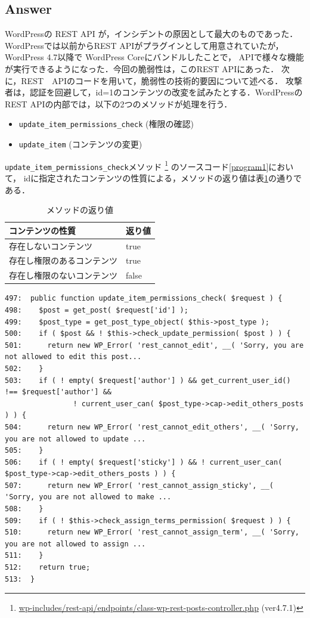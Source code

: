 \documentclass[uplatex]{jsarticle}
\begin{document}
\subsection*{Answer}

WordPressの REST API が，インシデントの原因として最大のものであった．
WordPressでは以前からREST APIがプラグインとして用意されていたが，
WordPress 4.7以降で WordPress Coreにバンドルしたことで，
APIで様々な機能が実行できるようになった．今回の脆弱性は，このREST APIにあった．
次に，REST　APIのコードを用いて，脆弱性の技術的要因について述べる．
攻撃者は，認証を回避して，id=1のコンテンツの改変を試みたとする．WordPressのREST APIの内部では，以下の2つのメソッドが処理を行う．

\begin{itemize}
    \item \verb|update_item_permissions_check| (権限の確認)
    \item \verb|update_item| (コンテンツの変更)
\end{itemize}

\verb|update_item_permissions_check|メソッド
\footnote{\url{wp-includes/rest-api/endpoints/class-wp-rest-posts-controller.php} (ver4.7.1)}
のソースコード\ref{program1}において，
idに指定されたコンテンツの性質による，メソッドの返り値は表\ref{tab:return_value}の通りである．

\begin{table}[htbp]
    \centering
    \caption{メソッドの返り値}
    \label{tab:return_value}
    \begin{tabular}{|l|l|}
    \hline
    コンテンツの性質 & 返り値 \\ \hline
    存在しないコンテンツ & true \\ \hline
    存在し権限のあるコンテンツ & true \\ \hline
    存在し権限のないコンテンツ & false \\ \hline
    \end{tabular}
\end{table}

\begin{lstlisting}[caption = update\_item\_permissions\_checkメソッド, label = program1]
497:  public function update_item_permissions_check( $request ) {
498:    $post = get_post( $request['id'] );
499:    $post_type = get_post_type_object( $this->post_type );
500:    if ( $post && ! $this->check_update_permission( $post ) ) {
501:      return new WP_Error( 'rest_cannot_edit', __( 'Sorry, you are not allowed to edit this post...
502:    }
503:    if ( ! empty( $request['author'] ) && get_current_user_id() !== $request['author'] &&
                ! current_user_can( $post_type->cap->edit_others_posts ) ) {
504:      return new WP_Error( 'rest_cannot_edit_others', __( 'Sorry, you are not allowed to update ...
505:    }
506:    if ( ! empty( $request['sticky'] ) && ! current_user_can( $post_type->cap->edit_others_posts ) ) {
507:      return new WP_Error( 'rest_cannot_assign_sticky', __( 'Sorry, you are not allowed to make ...
508:    }
509:    if ( ! $this->check_assign_terms_permission( $request ) ) {
510:      return new WP_Error( 'rest_cannot_assign_term', __( 'Sorry, you are not allowed to assign ...
511:    }
512:    return true;
513:  }
\end{lstlisting}
\end{document}
